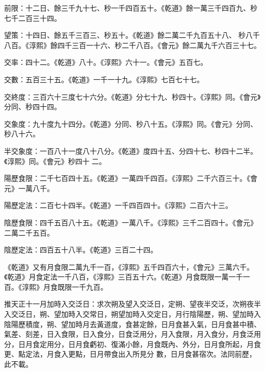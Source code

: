 \begin{pinyinscope}
 前限：十二日、餘三千九十七、秒一千四百五十。《乾道》餘一萬三千四百九、秒七千二百三十四。



 望策：十四日、餘五千三百三、秒五十。《乾道》餘二萬二千九百五十八、
 秒八千八百。《淳熙》餘四千三百一十六、秒二千八百。《會元》餘二萬九千六百三十七。



 交率：四十二。《乾道》八十。《淳熙》六十一。《會元》五百七。



 交數：五百三十五。《乾道》一千一十九。《淳熙》七百七十七。



 交終度：三百六十三度七十六分。《乾道》分七十九、秒四十。《淳熙》同。《會元》分同、秒四十四。



 交象度：九十度九十四分。《乾道》分同、秒八十五。《淳熙》同。《會元》分同、秒八十六。



 半交象度：一百八十一度八十八分。《乾道》度四十五、分四十七、秒四十二半。《淳熙》同。《會元》秒四十
 二。



 陽歷食限：二千七百四十五。《乾道》一萬四千四百。《淳熙》二千六百三十。《會元》一萬八千。



 陽歷定法：二百七十四半。《乾道》一千四百四十。《淳熙》二百六十三。



 陰歷食限：四千五百八十五。《乾道》一萬八千。《淳熙》三千二百四十。《會元》二萬二千五百。



 陰歷定法：四百五十八半。《乾道》三百二十四。



 《乾道》又有月食限二萬九千一百，《淳熙》五千四百六十，《會元》三萬六千。《乾道》月食定法一千八百，《淳熙》三百五十六。《乾道》月食既限一萬一千一百。《淳熙》月食既限一千九百。



 推天正十一月加時入交泛日：求次朔及望入交泛日，定朔、望夜半交泛，次朔夜半入交泛日，朔、望加時入交常日，朔望加時入交定日，月行陰陽歷，朔、望加時入陰陽歷積度，朔、望加時月去黃道度，食甚定餘，日月食甚入氣，日月食甚中積、氣差、刻差，日入食限，日入食分，日食泛用分，月入食限，月入食分，月食泛用分，日月食定用分，日月食虧初、復滿小餘，月食既內、外分，日月食所起，月食更、點定法，月食入更點，日月帶食出入所見分
 數，日月食甚宿次。法同前歷，此不載。




\end{pinyinscope}
